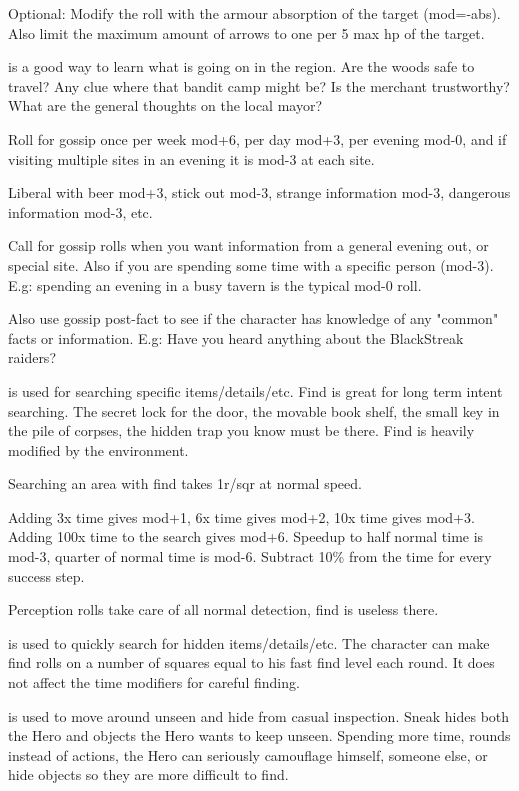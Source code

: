 Optional: Modify the roll with the armour absorption of the target (mod=-abs). Also limit the maximum amount of arrows to one per 5 max hp of the target.


 is a good way to learn what is going on in the region. Are the woods safe to travel? Any clue where that bandit camp might be? Is the merchant trustworthy? What are the general thoughts on the local mayor?

Roll for gossip once per week mod+6, per day mod+3, per evening mod-0, and if visiting multiple sites in an evening it is mod-3 at each site.

Liberal with beer mod+3, stick out mod-3, strange information mod-3, dangerous information mod-3, etc.

Call for gossip rolls when you want information from a general evening out, or special site. Also if you are spending some time with a specific person (mod-3). E.g: spending an evening in a busy tavern is the typical mod-0 roll.

Also use gossip post-fact to see if the character has knowledge of any "common" facts or information. E.g: Have you heard anything about the BlackStreak raiders?


 is used for searching specific items/details/etc. Find is great for long term intent searching. The secret lock for the door, the movable book shelf, the small key in the pile of corpses, the hidden trap you know must be there. Find is heavily modified by the environment.

Searching an area with find takes 1r/sqr at normal speed.

Adding 3x time gives mod+1, 6x time gives mod+2, 10x time gives mod+3. Adding 100x time to the search gives mod+6. Speedup to half normal time is mod-3, quarter of normal time is mod-6. Subtract 10\% from the time for every success step.

Perception rolls take care of all normal detection, find is useless there.


 is used to quickly search for hidden items/details/etc. The character can make find rolls on a number of squares equal to his fast find level each round. It does not affect the time modifiers for careful finding.


 is used to move around unseen and hide from casual inspection. Sneak hides both the Hero and objects the Hero wants to keep unseen. Spending more time, rounds instead of actions, the Hero can seriously camouflage himself, someone else, or hide objects so they are more difficult to find.


